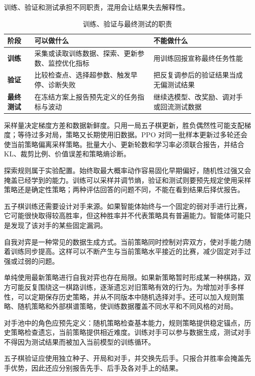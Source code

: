 \documentclass[UTF8,a4paper,zihao=-4,oneside,openany]{ctexbook}
\begin{document}
训练、验证和测试承担不同职责，混用会让结果失去解释性。

\begin{table}[htbp]
  \centering
  \caption{训练、验证与最终测试的职责}
  \label{tab:train-validation-test}
  \begin{tabularx}{\linewidth}{>{\bfseries}p{2.3cm}p{4.3cm}X}
    \toprule
    阶段 & 可以做什么 & 不能做什么 \\
    \midrule
    训练 & 采集或读取训练数据、探索、更新参数、监控优化指标 & 用训练回报宣称最终任务性能 \\
    验证 & 比较检查点、选择超参数、触发早停、诊断失败 & 把反复调参后的验证结果当成无偏测试结果 \\
    最终测试 & 在冻结方案上报告预先定义的任务指标与波动 & 继续选模型、改奖励、调对手或回流测试数据 \\
    \bottomrule
  \end{tabularx}
\end{table}


采样量决定梯度方差和数据新鲜度。只用一局五子棋更新，胜负偶然性可能支配梯度；等待过多对局，策略又长期使用旧数据。PPO 对同一批样本更新过多轮还会使当前策略偏离采样策略。批量大小、更新轮数和学习率必须联合报告，并结合 KL、裁剪比例、价值误差和策略熵诊断。

探索规则属于实验配置。始终取最大概率动作容易固化早期偏好，随机性过强又会掩盖已经学到的能力。训练可以采样并调节熵，验证和测试则要预先规定使用采样策略还是确定性策略；两种评估回答的问题不同，不能在看到结果后择优报告。

五子棋训练还需要设计对手来源。如果智能体始终与一个固定的弱对手进行比赛，它可能很快取得较高胜率，但这种胜率并不代表策略具有普遍能力。智能体可能只是发现了该对手的某些固定漏洞。

自我对弈是一种常见的数据生成方式。当前策略同时控制对弈双方，使对手能力随着训练同步提高。这样可以不断产生与当前策略水平接近的比赛，减少固定对手过强或过弱的问题。

单纯使用最新策略进行自我对弈也存在局限。如果新策略暂时形成某一种棋路，双方可能反复围绕这一棋路训练，逐渐遗忘对旧策略有效的行为。为增加对手多样性，可以定期保存历史策略，并从不同版本中随机选择对手。还可以加入规则策略、随机策略和外部棋谱策略，使训练数据覆盖不同水平和不同风格的对局。


对手池中的角色应预先定义：随机策略检查基本能力，规则策略提供稳定锚点，历史策略检查遗忘，当前策略提供相近难度。训练对手可以参与数据生成，测试对手不得因为测试结果而被加入当前模型的训练循环。

五子棋验证应使用独立种子、开局和对手，并交换先后手。只报合并胜率会掩盖先手优势，因此还应分别报告先手、后手及各对手上的结果。
\end{document}
